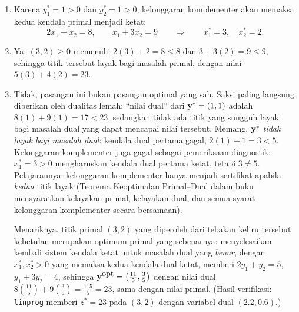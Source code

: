\begin{enumerate}
\item[(a)] Karena $y_1^* = 1 > 0$ dan $y_2^* = 1 > 0$, kelonggaran komplementer akan memaksa kedua kendala primal menjadi ketat:
\[
2x_1 + x_2 = 8, \qquad x_1 + 3x_2 = 9
\qquad\Longrightarrow\qquad
x_1^* = 3, \quad x_2^* = 2 .
\]
\item[(b)] Ya: $(3, 2) \ge \mathbf{0}$ memenuhi $2(3) + 2 = 8 \le 8$ dan $3 + 3(2) = 9 \le 9$, sehingga titik tersebut layak bagi masalah primal, dengan nilai $5(3) + 4(2) = 23$.
\item[(c)] Tidak, pasangan ini bukan pasangan optimal yang sah. Saksi paling langsung diberikan oleh dualitas lemah: ``nilai dual'' dari $\mathbf{y}^* = (1,1)$ adalah $8(1) + 9(1) = 17 < 23$, sedangkan tidak ada titik yang sungguh layak bagi masalah dual yang dapat mencapai nilai tersebut. Memang, $\mathbf{y}^*$ \emph{tidak layak bagi masalah dual}: kendala dual pertama gagal, $2(1) + 1 = 3 < 5$. Kelonggaran komplementer juga gagal sebagai pemeriksaan diagnostik: $x_1^* = 3 > 0$ mengharuskan kendala dual pertama ketat, tetapi $3 \neq 5$. Pelajarannya: kelonggaran komplementer hanya menjadi sertifikat apabila \emph{kedua} titik layak (Teorema Keoptimalan Primal--Dual dalam buku mensyaratkan kelayakan primal, kelayakan dual, dan semua syarat kelonggaran komplementer secara bersamaan).

Menariknya, titik primal $(3, 2)$ yang diperoleh dari tebakan keliru tersebut kebetulan merupakan optimum primal yang sebenarnya: menyelesaikan kembali sistem kendala ketat untuk masalah dual yang \emph{benar}, dengan $x_1^*, x_2^* > 0$ yang memaksa kedua kendala dual ketat, memberi $2y_1 + y_2 = 5$, $y_1 + 3y_2 = 4$, sehingga $\mathbf{y}^{\mbox{opt}} = \left(\tfrac{11}{5}, \tfrac{3}{5}\right)$ dengan nilai dual $8\left(\tfrac{11}{5}\right) + 9\left(\tfrac{3}{5}\right) = \tfrac{115}{5} = 23$, sama dengan nilai primal. (Hasil verifikasi: \texttt{linprog} memberi $z^* = 23$ pada $(3,2)$ dengan variabel dual $(2.2, 0.6)$.)
\end{enumerate}



